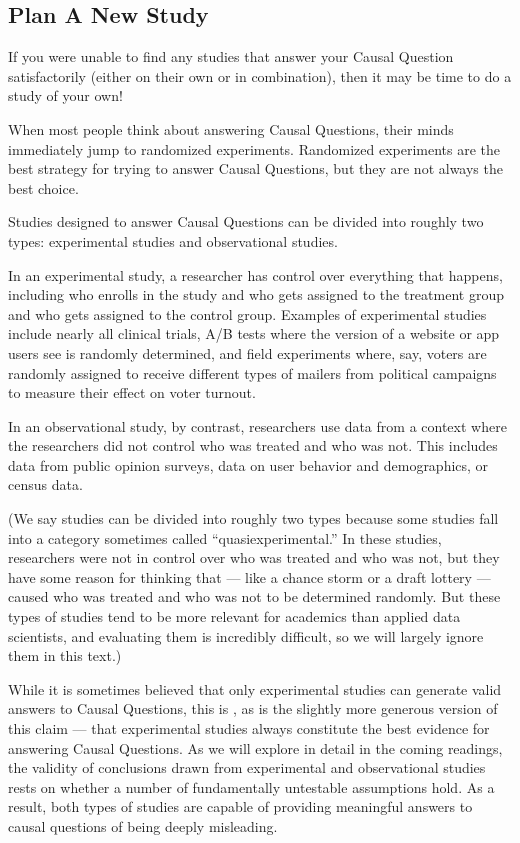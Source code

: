 \documentclass[letterpaper,10pt,english]{jupyterBook}
\begin{document}
\subsection{Plan A New Study}
\label{\detokenize{30_questions/35_using_causal_questions:plan-a-new-study}}
\sphinxAtStartPar
If you were unable to find any studies that answer your Causal Question satisfactorily (either on their own or in combination), then it may be time to do a study of your own!

\sphinxAtStartPar
When most people think about answering Causal Questions, their minds immediately jump to randomized experiments. Randomized experiments are  the best strategy for trying to answer Causal Questions, but they are not always the best choice.

\sphinxAtStartPar
Studies designed to answer Causal Questions can be divided into roughly two types: experimental studies and observational studies.

\sphinxAtStartPar
In an experimental study, a researcher has control over everything that happens, including who enrolls in the study and who gets assigned to the treatment group and who gets assigned to the control group. Examples of experimental studies include nearly all clinical trials, A/B tests where the version of a website or app users see is randomly determined, and field experiments where, say, voters are randomly assigned to receive different types of mailers from political campaigns to measure their effect on voter turnout.

\sphinxAtStartPar
In an observational study, by contrast, researchers use data from a context where the researchers did not control who was treated and who was not. This includes data from public opinion surveys, data on user behavior and demographics, or census data.

\sphinxAtStartPar
(We say studies can be divided into roughly two types because some studies fall into a category sometimes called “quasi\sphinxhyphen{}experimental.” In these studies, researchers were not in control over who was treated and who was not, but they have some reason for thinking that  — like a chance storm or a draft lottery — caused who was treated and who was not to be determined randomly. But these types of studies tend to be more relevant for academics than applied data scientists, and evaluating them is incredibly difficult, so we will largely ignore them in this text.)

\sphinxAtStartPar
While it is sometimes believed that only experimental studies can generate valid answers to Causal Questions, this is , as is the slightly more generous version of this claim — that experimental studies always constitute the best evidence for answering Causal Questions. As we will explore in  detail in the coming readings, the validity of conclusions drawn from  experimental and observational studies rests on whether a number of fundamentally untestable assumptions hold. As a result, both types of studies are capable of providing meaningful answers to causal questions  of being deeply misleading.
\end{document}
